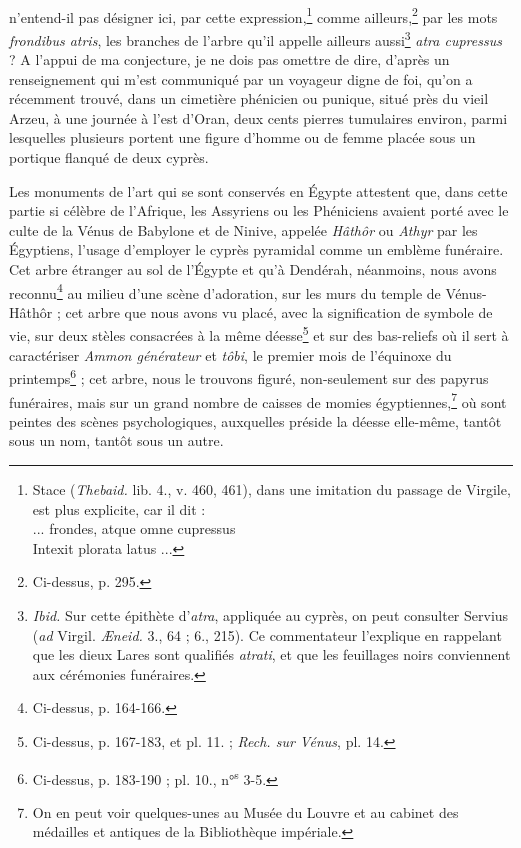 \documentclass{article}
\begin{document}
\paragraph{}
n'entend-il pas désigner ici, par cette expression,\footnote{Stace (\emph{Thebaid.} lib. 4., v. 460, 461), dans une imitation du passage de Virgile, est plus explicite, car il dit :\\\hspace*{10mm}... frondes, atque omne cupressus\\\hspace*{10mm}Intexit plorata latus ...} comme ailleurs,\footnote{Ci-dessus, p. 295.} par les mots \emph{frondibus atris}, les branches de l'arbre qu'il appelle ailleurs aussi\footnote{\emph{Ibid.} Sur cette épithète d'\emph{atra}, appliquée au cyprès, on peut consulter Servius (\emph{ad} Virgil. \emph{Æneid.} 3., 64 ; 6., 215). Ce commentateur l'explique en rappelant que les dieux Lares sont qualifiés \emph{atrati}, et que les feuillages noirs conviennent aux cérémonies funéraires.} \emph{atra cupressus} ? A l'appui de ma conjecture, je ne dois pas omettre de dire, d'après un renseignement qui m'est communiqué par un voyageur digne de foi, qu'on a récemment trouvé, dans un cimetière phénicien ou punique, situé près du vieil Arzeu, à une journée à l'est d'Oran, deux cents pierres tumulaires environ, parmi lesquelles plusieurs portent une figure d'homme ou de femme placée sous un portique flanqué de deux cyprès.

Les monuments de l'art qui se sont conservés en Égypte attestent que, dans cette partie si célèbre de l'Afrique, les Assyriens ou les Phéniciens avaient porté avec le culte de la Vénus de Babylone et de Ninive, appelée \emph{Hâthôr} ou \emph{Athyr} par les Égyptiens, l'usage d'employer le cyprès pyramidal comme un emblème funéraire. Cet arbre étranger au sol de l'Égypte et qu'à Dendérah, néanmoins, nous avons reconnu\footnote{Ci-dessus, p. 164-166.} au milieu d'une scène d'adoration, sur les murs du temple de Vénus-Hâthôr ; cet arbre que nous avons vu placé, avec la signification de symbole de vie, sur deux stèles consacrées à la même déesse\footnote{Ci-dessus, p. 167-183, et pl. 11. ; \emph{Rech. sur Vénus}, pl. 14.} et sur des bas-reliefs où il sert à caractériser \emph{Ammon générateur} et \emph{tôbi}, le premier mois de l'équinoxe du printemps\footnote{Ci-dessus, p. 183-190 ; pl. 10., n°\textsuperscript{s} 3-5.} ; cet arbre, nous le trouvons figuré, non-seulement sur des papyrus funéraires, mais sur un grand nombre de caisses de momies égyptiennes,\footnote{On en peut voir quelques-unes au Musée du Louvre et au cabinet des médailles et antiques de la Bibliothèque impériale.} où sont peintes des scènes psychologiques, auxquelles préside la déesse elle-même, tantôt sous un nom, tantôt sous un autre.
\end{document}
